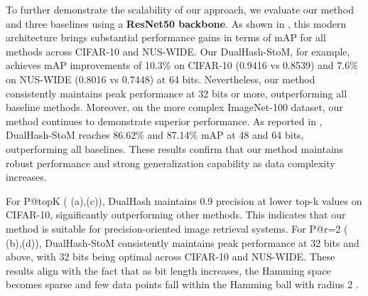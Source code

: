 To further demonstrate the scalability of our approach, we evaluate our method and three baselines using a \textbf{ResNet50 backbone}. As shown in , this modern architecture brings substantial performance gains in terms of mAP for all methods across CIFAR-10 and NUS-WIDE. Our DualHash-StoM, for example, achieves mAP improvements of 10.3\% on CIFAR-10 (0.9416 vs 0.8539) and 7.6\% on NUS-WIDE (0.8016 vs 0.7448) at 64 bits. Nevertheless, our method consistently maintains peak performance at 32 bits or more, outperforming all baseline methods. Moreover, on the more complex ImageNet-100 dataset, our method continues to demonstrate superior performance. As reported in , DualHash-StoM reaches 86.62\% and 87.14\% mAP at 48 and 64 bits, outperforming all baselines. These results confirm that our method maintains robust performance and strong generalization capability as data complexity increases.

For P@topK ( (a),(c)),  DualHash maintains 0.9 precision at lower top-k values on CIFAR-10, significantly outperforming other methods. This indicates that our method is suitable for precision-oriented image retrieval systems.
For P@r=2 ( (b),(d)), DualHash-StoM consistently maintains peak performance at 32 bits and above, with 32 bits being optimal across CIFAR-10 and NUS-WIDE. These results align with the fact that as bit length increases, the Hamming space becomes sparse and few data points fall within the Hamming ball with radius 2 \cite{norouzi2012fast}.

